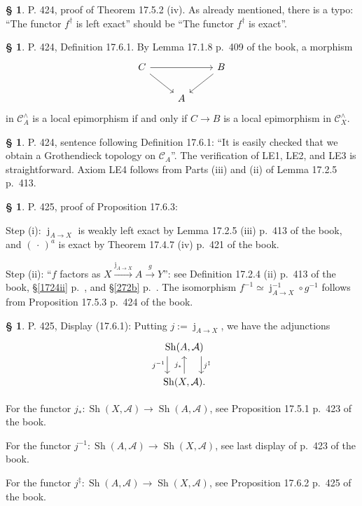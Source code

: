 \documentclass[12pt]{article}%
\theoremstyle{remark}
\theoremstyle{definition}
\newtheorem{s}[thm]{\S}%
\newcommand{\oo}{\operatorname}
\newcommand{\A}{\mathcal A}
\newcommand{\C}{\mathcal C}
\newcommand{\xr}{\xrightarrow}
\begin{document}
%

\begin{s} 
P. 424, proof of Theorem 17.5.2 (iv). As already mentioned, there is a typo: ``The functor $f^\dagger$ is left exact'' should be ``The functor $f^\dagger$ is exact''. %
\end{s}

%

\begin{s}\label{1761}
P. 424, Definition 17.6.1. By Lemma 17.1.8 p.~409 of the book, a morphism 
$$
\begin{tikzcd} 
C\ar{rr}\ar{dr}&&B\ar{dl}\\ 
{}&A
\end{tikzcd}
$$ 
in $\C_A^\wedge$ is a local epimorphism if and only if $C\to B$ is a local epimorphism in $\C_X^\wedge$.
\end{s}

%

\begin{s}
P. 424, sentence following Definition 17.6.1: ``It is easily checked that we obtain a Grothendieck topology on $\C_A$''. The verification  of LE1, LE2, and LE3 is straightforward. Axiom LE4 follows from Parts (iii) and (ii) of Lemma 17.2.5 p.~413.
\end{s}

%

\begin{s}
P. 425, proof of Proposition 17.6.3: 

Step (i): $\oo j_{A\to X}$ is weakly left exact by Lemma 17.2.5 (iii) p.~413 of the book, and $(\,\cdot\,)^a$ is exact by Theorem 17.4.7 (iv) p.~421 of the book.

Step (ii): ``$f$ factors as $X\xr{\oo j_{A\to X}}A\xr gY$'': see Definition 17.2.4 (ii) p.~413 of the book, \S\ref{1724ii} p.~\pageref{1724ii}, and \S\ref{272b} p.~\pageref{272b}. The isomorphism $f^{-1}\simeq\oo j_{A\to X}^{-1}\circ g^{-1}$ follows from Proposition 17.5.3 p.~424 of the book.
\end{s} 

% 

\begin{s} 
P. 425, Display (17.6.1): Putting $j:=\oo j_{A\to X}$, we have the adjunctions 
$$
\begin{tikzcd}
\oo{Sh}(A,\A)\ar[xshift=-4ex]{d}[swap]{j^{-1}}\ar[xshift=4ex]{d}{j^\ddagger}\\ 
\oo{Sh}(X,\A).\ar{u}{j_*}
\end{tikzcd}
$$ 

For the functor $j_*:\oo{Sh}(X,\A)\to\oo{Sh}(A,\A)$, see Proposition 17.5.1 p.~423 of the book. 

For the functor $j^{-1}:\oo{Sh}(A,\A)\to\oo{Sh}(X,\A)$, see last display of p.~423 of the book. 

For the functor $j^\ddagger:\oo{Sh}(A,\A)\to\oo{Sh}(X,\A)$, see Proposition 17.6.2 p.~425 of the book.
\end{s}
\end{document}
